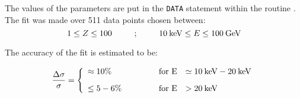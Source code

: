 The values of the parameters are put in 
the {\tt DATA} statement within the routine .
The fit was made over 511 data points chosen between:
\[
1 \leq Z \leq 100 \makebox[2cm]{;} 10 \: \mbox{keV} \leq E \leq 100 \: 
\mbox{GeV}
\]
 
The accuracy of the fit is estimated to be:
 
\vspace{.3cm}
\[
\frac{\Delta\sigma}{\sigma} = \left\{ \begin{array}{lcl}
\approx 10\% & \makebox[2cm][r]{\rm for E} & \simeq 10\: \mbox{keV}-20\: 
\mbox{keV} \vspace{.3cm} \\
\leq 5-6\% & \makebox[2cm][r]{\rm for E} & > 20 \: \mbox{keV}
\end{array} \right.
\]
